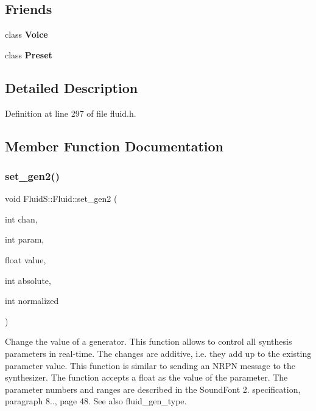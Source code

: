 \subsection*{Friends}
\begin{DoxyCompactItemize}
\item 
\mbox{\label{class_fluid_s_1_1_fluid_a24657954e9f1d12330a031c549e6e850}} 
class {\bfseries Voice}
\item 
\mbox{\label{class_fluid_s_1_1_fluid_ad3f56d18622fd9af0064d524c0b50d7a}} 
class {\bfseries Preset}
\end{DoxyCompactItemize}


\subsection{Detailed Description}


Definition at line 297 of file fluid.\+h.



\subsection{Member Function Documentation}
\mbox{\label{class_fluid_s_1_1_fluid_a244d9c59f3fb961424d020c0dc666b7f}} 
\subsubsection{\texorpdfstring{set\+\_\+gen2()}{set\_gen2()}}
{\footnotesize\ttfamily void Fluid\+S\+::\+Fluid\+::set\+\_\+gen2 (\begin{DoxyParamCaption}\item[{int}]{chan,  }\item[{int}]{param,  }\item[{float}]{value,  }\item[{int}]{absolute,  }\item[{int}]{normalized }\end{DoxyParamCaption})}

Change the value of a generator. This function allows to control all synthesis parameters in real-\/time. The changes are additive, i.\+e. they add up to the existing parameter value. This function is similar to sending an N\+R\+PN message to the synthesizer. The function accepts a float as the value of the parameter. The parameter numbers and ranges are described in the Sound\+Font 2. specification, paragraph 8.., page 48. See also \textquotesingle{}fluid\+\_\+gen\+\_\+type\textquotesingle{}.

